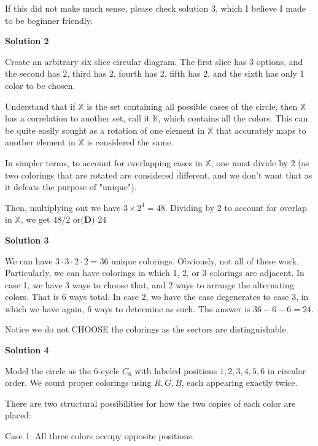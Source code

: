 \begin{enumerate}
 If this did not make much sense, please check solution 3, which I believe I made to be beginner friendly.

 



\textbf{Solution 2}

Create an arbitrary six slice circular diagram. The first slice has 3 options, and the second has 2, third has 2, fourth has 2, fifth has 2, and the sixth has only 1 color to be chosen.

 Understand that if \( \mathbb{X} \) is the set containing all possible cases of the circle, then \( \mathbb{X} \) has a correlation to another set, call it \( \mathbb{K} \), which contains all the colors. This can be quite easily sought as a rotation of one element in \( \mathbb{X} \) that accurately maps to another element in \( \mathbb{X} \) is considered the same.

 In simpler terms, to account for overlapping cases in \( \mathbb{X} \), one must divide by 2 (as two colorings that are rotated are considered different, and we don't want that as it defeats the purpose of "unique").

 Then, multiplying out we have \( 3 \times 2^4 = 48 \). Dividing by 2 to account for overlap in \( \mathbb{X} \), we get \( 48/2 \) or$\boxed{\textbf{(D) } 24}$




\textbf{Solution 3}

We can have $3 \cdot 3 \cdot 2 \cdot 2 = 36$ unique colorings. Obviously, not all of these work. Particularly, we can have colorings in which 1, 2, or 3 colorings are adjacent. In case 1, we have 3 ways to choose that, and 2 ways to arrange the alternating colors. That is 6 ways total. In case 2, we have the case degenerates to case 3, in which we have again, 6 ways to determine as such. The answer is $36 - 6 -6 = \boxed{24}$.

 Notice we do not CHOOSE the colorings as the sectors are distinguishable.

 



\textbf{Solution 4}

Model the circle as the $6$-cycle \(C_6\) with labeled positions \(1,2,3,4,5,6\) in circular order. We count proper colorings using \(R,G,B\), each appearing exactly twice.

 There are two structural possibilities for how the two copies of each color are placed:

 
{Case 1: All three colors occupy opposite positions.}


\end{enumerate}
